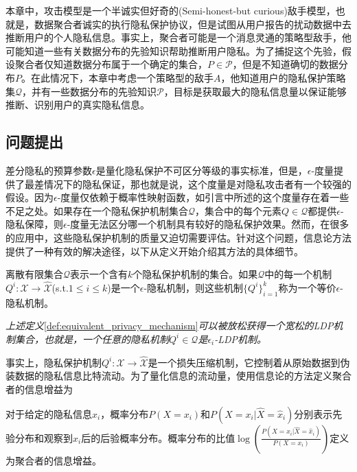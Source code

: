 本章中，攻击模型是一个半诚实但好奇的(Semi-honest-but curious)敌手模型，也就是，数据聚合者诚实的执行隐私保护协议，但是试图从用户报告的扰动数据中去推断用户的个人隐私信息。事实上，聚合者可能是一个消息灵通的策略型敌手，他可能知道一些有关数据分布的先验知识帮助推断用户隐私。为了捕捉这个先验，假设聚合者仅知道数据分布属于一个确定的集合，$P\in \mathcal{P}$，但是不知道确切的数据分布$P$。在此情况下，本章中考虑一个策略型的敌手$A$，他知道用户的隐私保护策略集$\mathcal{Q}$，并有一些数据分布的先验知识$\mathcal{P}$，目标是获取最大的隐私信息量以保证能够推断、识别用户的真实隐私信息。

\subsection{问题提出}\label{sec:chapter06-problem}
差分隐私的预算参数$\epsilon$是量化隐私保护不可区分等级的事实标准，但是，$\epsilon$-度量提供了最差情况下的隐私保证，那也就是说，这个度量是对隐私攻击者有一个较强的假设。因为$\epsilon$-度量仅依赖于概率性映射函数，如引言中所述的这个度量存在着一些不足之处\cite{lopuhaa-zwakenberg2019information}。如果存在一个隐私保护机制集合$\mathcal{Q}$，集合中的每个元素$Q\in \mathcal{Q}$都提供$\epsilon$-隐私保障，则$\epsilon$-度量无法区分哪一个机制具有较好的隐私保护效果。然而，在很多的应用中，这些隐私保护机制的质量又迫切需要评估。针对这个问题，信息论方法提供了一种有效的解决途径，以下从定义开始介绍其方法的具体细节。

\begin{definition}\label{def:equivalent_privacy_mechanism}离散有限集合$\mathcal{Q}$表示一个含有$k$个隐私保护机制的集合。如果$\mathcal{Q}$中的每一个机制$Q^i:\mathcal{X}\rightarrow\hat{\mathcal{X}}$(s.t.$1\leq i \leq k$)是一个$\epsilon$-隐私机制，则这些机制$\{Q^i\}_{i=1}^{k}$称为一个等价$\epsilon$-隐私机制。
	
\end{definition}
\begin{remark}{\em 上述定义}\ref{def:equivalent_privacy_mechanism}{\em 可以被放松获得一个宽松的LDP机制集合，也就是，一个任意的隐私机制$Q^i \in \mathcal{Q}$是$\epsilon_i$-LDP机制。}
\end{remark}


事实上，隐私保护机制$Q^i:\mathcal{X}\rightarrow\hat{\mathcal{X}}$是一个损失压缩机制，它控制着从原始数据到伪装数据的隐私信息比特流动。为了量化信息的流动量，使用信息论的方法定义聚合者的信息增益为
\begin{definition}\label{def:information_gain}
	对于给定的隐私信息$x_i$，概率分布$P(X=x_i)$和$P(X=x_i|\hat{X}=\hat{x}_i)$分别表示先验分布和观察到$\hat{x}_i$后的后验概率分布。概率分布的比值$\log\left(\frac{P(X=x_i|\hat{X}=\hat{x}_i)}{P(X=x_i)}\right)$定义为聚合者的信息增益。
\end{definition}

